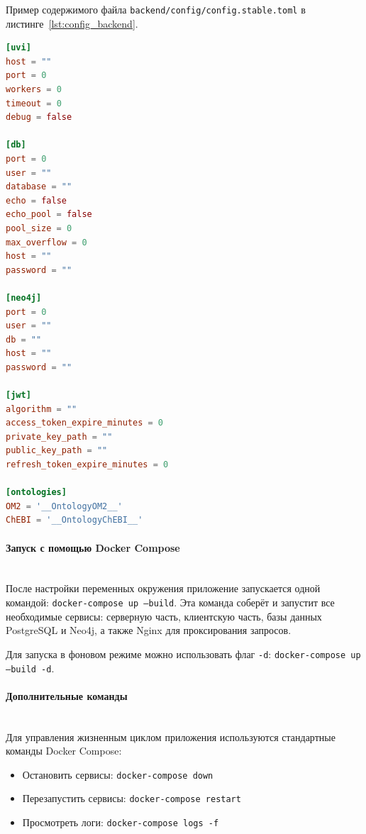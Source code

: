 Пример содержимого файла \texttt{backend/config/config.stable.toml} в листинге~\ref{lst:config_backend}.
\begin{lstlisting}[frame=single, basicstyle=\footnotesize\ttfamily, label={lst:config_backend}, caption={Заполнение конфигурационного файла серверного приложения},captionpos=b, breaklines=true, breakatwhitespace=true, language=toml]
[uvi]
host = ""
port = 0
workers = 0
timeout = 0
debug = false

[db]
port = 0
user = ""
database = ""
echo = false
echo_pool = false
pool_size = 0
max_overflow = 0
host = ""
password = ""

[neo4j]
port = 0
user = ""
db = ""
host = ""
password = ""

[jwt]
algorithm = ""
access_token_expire_minutes = 0
private_key_path = ""
public_key_path = ""
refresh_token_expire_minutes = 0

[ontologies]
OM2 = '__OntologyOM2__'
ChEBI = '__OntologyChEBI__'
\end{lstlisting}

\paragraph{Запуск с помощью Docker Compose} \mbox{}\\

После настройки переменных окружения приложение запускается одной командой: \texttt{docker-compose up --build}.
Эта команда соберёт и запустит все необходимые сервисы: серверную часть, клиентскую часть, базы данных PostgreSQL и Neo4j, а также Nginx для проксирования запросов.

Для запуска в фоновом режиме можно использовать флаг \texttt{-d}: \texttt{docker-compose up --build -d}.

\paragraph{Дополнительные команды} \mbox{}\\

Для управления жизненным циклом приложения используются стандартные команды Docker Compose:
\begin{itemize}
    \item Остановить сервисы: \texttt{docker-compose down}
    \item Перезапустить сервисы: \texttt{docker-compose restart}
    \item Просмотреть логи: \texttt{docker-compose logs -f}
\end{itemize}

